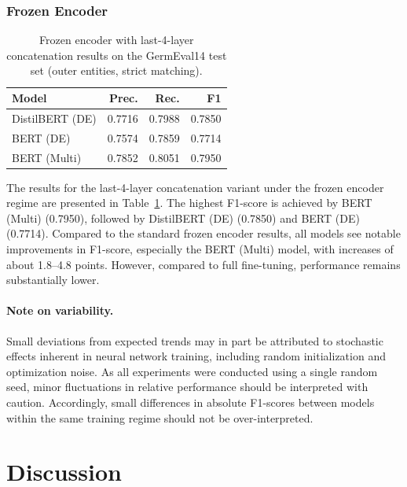 \documentclass[11pt,a4paper,twocolumn]{article}
\begin{document}
\subsubsection{Frozen Encoder}
\begin{table}[h]
    \centering
    \begin{tabular}{lrrr}
        \toprule
        \textbf{Model} & \textbf{Prec.} & \textbf{Rec.} & \textbf{F1} \\
        \midrule
        DistilBERT (DE) & 0.7716 & 0.7988 & 0.7850 \\
        BERT (DE) & 0.7574 & 0.7859 & 0.7714 \\
        BERT (Multi) & 0.7852 & 0.8051 & 0.7950 \\
        \bottomrule
    \end{tabular}
    \caption{Frozen encoder with last-4-layer concatenation results on the GermEval14 test set (outer entities, strict matching).}
    \label{tab:last4-frozen-encoder-results}
\end{table}

The results for the last-4-layer concatenation variant under the frozen encoder regime are presented in Table~\ref{tab:last4-frozen-encoder-results}. The highest F1-score is achieved by BERT (Multi) (0.7950), followed by DistilBERT (DE) (0.7850) and BERT (DE) (0.7714). Compared to the standard frozen encoder results, all models see notable improvements in F1-score, especially the BERT (Multi) model, with increases of about 1.8–4.8 points. However, compared to full fine-tuning, performance remains substantially lower.
\paragraph{Note on variability.}

Small deviations from expected trends may in part be attributed to stochastic effects inherent in neural network training, including random initialization and optimization noise. As all experiments were conducted using a single random seed, minor fluctuations in relative performance should be interpreted with caution.
Accordingly, small differences in absolute F1-scores between models within the same training regime should not be over-interpreted.

\section{Discussion}
\end{document}
